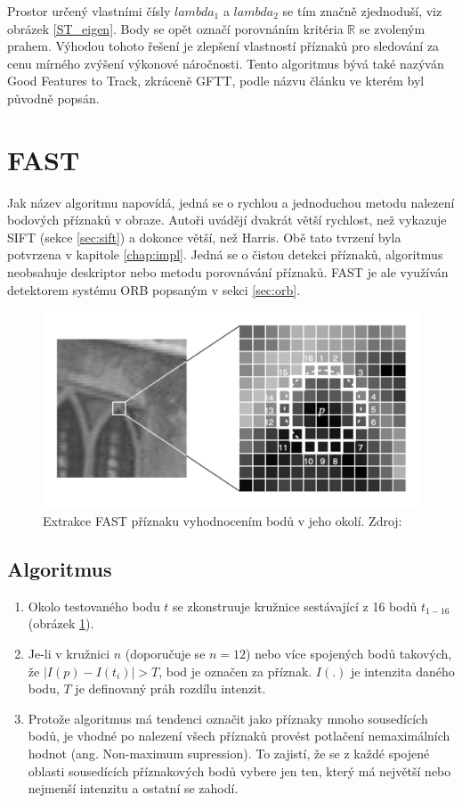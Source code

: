 	Prostor určený vlastními čísly $lambda_1$ a $lambda_2$ se tím značně zjednoduší, viz obrázek \ref{ST_eigen}. Body se opět označí porovnáním kritéria $\mathbb{R}$ se zvoleným prahem. Výhodou tohoto řešení je zlepšení vlastností příznaků pro sledování za cenu mírného zvýšení výkonové náročnosti. Tento algoritmus bývá také nazýván Good Features to Track, zkráceně GFTT, podle názvu článku ve kterém byl původně popsán.

\section{FAST}

	Jak název algoritmu napovídá, jedná se o rychlou a jednoduchou metodu nalezení bodových příznaků v obraze. Autoři uvádějí dvakrát větší rychlost, než vykazuje SIFT (sekce \ref{sec:sift}) a dokonce větší, než Harris. Obě tato tvrzení byla potvrzena v kapitole \ref{chap:impl}. Jedná se o čistou detekci příznaků, algoritmus neobsahuje deskriptor nebo metodu porovnávání příznaků. FAST \cite{rosten2010faster} je ale využíván detektorem systému ORB popsaným v sekci \ref{sec:orb}.
	
	\begin{figure}[!ht] 
		\centering
			\includegraphics[width=5in]{img/fast_corner.png}
		\caption{Extrakce FAST příznaku vyhodnocením bodů v jeho okolí. Zdroj: \cite{rosten2010faster} } 	
		\label{fast_corner}
	\end{figure}
	
	\subsection{Algoritmus}
	
		\begin{enumerate}
			\item Okolo testovaného bodu $t$ se zkonstruuje kružnice sestávající z 16 bodů $t_{1-16}$ (obrázek \ref{fast_corner}). 
			\item Je-li v kružnici $n$ (doporučuje se $n=12$) nebo více spojených bodů takových, že $\lvert I(p) - I(t_i) \rvert > T$, bod je označen za příznak. $I(.)$ je intenzita daného bodu, $T$ je definovaný práh rozdílu intenzit.
			\item Protože algoritmus má tendenci označit jako příznaky mnoho sousedících bodů, je vhodné po nalezení všech příznaků provést potlačení nemaximálních hodnot (ang. Non-maximum supression). To zajistí, že se z každé spojené oblasti sousedících příznakových bodů vybere jen ten, který má největší nebo nejmenší intenzitu a ostatní se zahodí.
		\end{enumerate}
		
